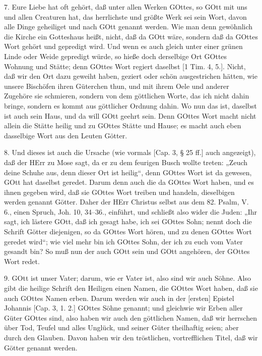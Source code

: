 7. Eure Liebe hat oft gehört, daß unter allen Werken GOttes, so GOtt mit uns und allen Creaturen hat, das herrlichste und größte Werk sei sein Wort, davon alle Dinge geheiliget und nach GOtt genannt werden. Wie man denn gewöhnlich die Kirche ein Gotteshaus heißt, nicht, daß da GOtt wäre, sondern daß da GOttes Wort gehört und gepredigt wird. Und wenn es auch gleich unter einer grünen Linde oder Weide gepredigt würde, so hieße doch derselbige Ort GOttes Wohnung und Stätte; denn GOttes Wort regiert daselbst [1 Tim. 4, 5.]. Nicht, daß wir den Ort dazu geweiht haben, geziert oder schön ausgestrichen hätten, wie unsere Bischöfen ihren Güterchen thun, und mit ihrem Oele und anderer Zugehöre sie schmieren, sondern von dem göttlichen Worte, das ich nicht dahin bringe, sondern es kommt aus göttlicher Ordnung dahin. Wo nun das ist, daselbst ist auch sein Haus, und da will GOtt geehrt sein. Denn GOttes Wort macht nicht allein die Stätte heilig und zu GOttes Stätte und Hause; es macht auch eben dasselbige Wort aus den Leuten Götter.

8. Und dieses ist auch die Ursache (wie vormals [Cap. 3, § 25 ff.] auch angezeigt), daß der HErr zu Mose sagt, da er zu dem feurigen Busch wollte treten: „Zeuch deine Schuhe aus, denn dieser Ort ist heilig“, denn GOttes Wort ist da gewesen, GOtt hat daselbst geredet. Darum denn auch die da GOttes Wort haben, und es ihnen gegeben wird, daß sie GOttes Wort treiben und handeln, dieselbigen werden genannt Götter. Daher der HErr Christus selbst aus dem 82. Psalm, V. 6., einen Spruch, Joh. 10, 34–36., einführt, und schließt also wider die Juden: „Ihr sagt, ich lästere GOtt, daß ich gesagt habe, ich sei GOttes Sohn; nennt doch die Schrift Götter diejenigen, so da GOttes Wort hören, und zu denen GOttes Wort geredet wird“; wie viel mehr bin ich GOttes Sohn, der ich zu euch vom Vater gesandt bin? So muß nun der auch GOtt sein und GOtt angehören, der GOttes Wort redet.

9. GOtt ist unser Vater; darum, wie er Vater ist, also sind wir auch Söhne. Also gibt die heilige Schrift den Heiligen einen Namen, die GOttes Wort haben, daß sie auch GOttes Namen erben. Darum werden wir auch in der [ersten] Epistel Johannis [Cap. 3, 1. 2.] GOttes Söhne genannt; und gleichwie wir Erben aller Güter GOttes sind, also haben wir auch den göttlichen Namen, daß wir herrschen über
Tod, Teufel und alles Unglück, und seiner Güter theilhaftig seien; aber durch den Glauben. Davon haben wir den tröstlichen, vortrefflichen Titel, daß wir Götter genannt werden.

